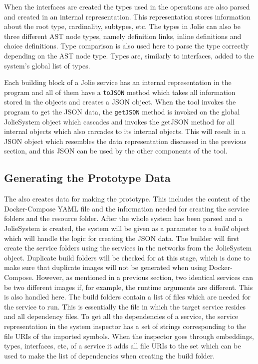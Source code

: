 When the interfaces are created the types used in the operations are also parsed and created in an internal representation.
This representation stores information about the root type, cardinality, subtypes, etc.
The types in Jolie can also be three different AST node types, namely definition links, inline definitions and choice definitions. Type comparison is also used here to parse the type correctly depending on the AST node type.
Types are, similarly to interfaces, added to the system's global list of types.

Each building block of a Jolie service has an internal representation in the \javatoolname[] program and all of them have a \texttt{toJSON} method which takes all information stored in the objects and creates a JSON object.
When the tool invokes the \javatoolname[] program to get the JSON data, the \texttt{getJSON} method is invoked on the global JolieSystem object which cascades and invokes the getJSON method for all internal objects which also carcades to its internal objects.
This will result in a JSON object which resembles the data representation discussed in the previous section, and this JSON can be used by the other components of the tool.

\subsection{Generating the Prototype Data}
The \javatoolname[] also creates data for making the prototype. This includes the content of the Docker-Compose YAML file and the information needed for creating the service folders and the resource folder.
After the whole system has been parsed and a JolieSystem is created, the system will be given as a parameter to a \textit{build} object which will handle the logic for creating the JSON data.
The builder will first create the service folders using the services in the networks from the JolieSystem object. Duplicate build folders will be checked for at this stage, which is done to make sure that duplicate images will not be generated when using Docker-Compose.
However, as mentioned in a previous section, two identical services can be two different images if, for example, the runtime arguments are different. This is also handled here.
The build folders contain a list of files which are needed for the service to run. This is essentially the file in which the target service resides and all dependency files.
To get all the dependencies of a service, the service representation in the system inspector has a set of strings corresponding to the file URIs of the imported symbols.
When the inspector goes through embeddings, types, interfaces, etc, of a service it adds all file URIs to the set which can be used to make the list of dependencies when creating the build folder.

